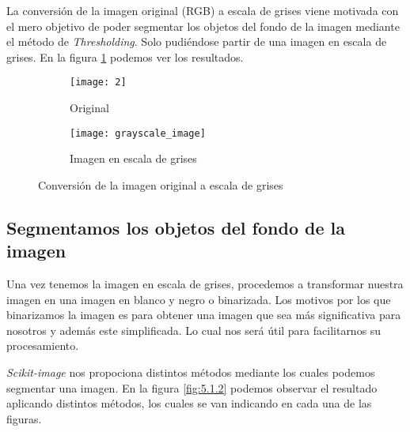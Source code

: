 La conversión de la imagen original (RGB) a escala de grises viene motivada con el mero objetivo de poder segmentar los objetos del fondo de la imagen mediante el método de \textit{Thresholding}. Solo pudiéndose partir de una imagen en escala de grises. En la figura \ref{fig:5.1.1} podemos ver los resultados.

\begin{figure}
	\centering
	\begin{subfigure}[b]{0.45\textwidth}
        \texttt{[image: 2]}
        \caption{Original}
    \end{subfigure}
    \begin{subfigure}[b]{0.45\textwidth}
        \texttt{[image: grayscale\_image]}
        \caption{Imagen en escala de grises}
    \end{subfigure}
    \caption{Conversión de la imagen original a escala de grises}
	\label{fig:5.1.1}
\end{figure}

\subsection{Segmentamos los objetos del fondo de la imagen}

Una vez tenemos la imagen en escala de grises, procedemos a transformar nuestra imagen en una imagen en blanco y negro o binarizada. Los motivos por los que binarizamos la imagen es para obtener una imagen que sea más significativa para nosotros y además este simplificada. Lo cual nos será útil para facilitarnos su procesamiento.

\textit{Scikit-image} nos propociona distintos métodos mediante los cuales podemos segmentar una imagen. En la figura \ref{fig:5.1.2} podemos observar el resultado aplicando distintos métodos, los cuales se van indicando en cada una de las figuras.

